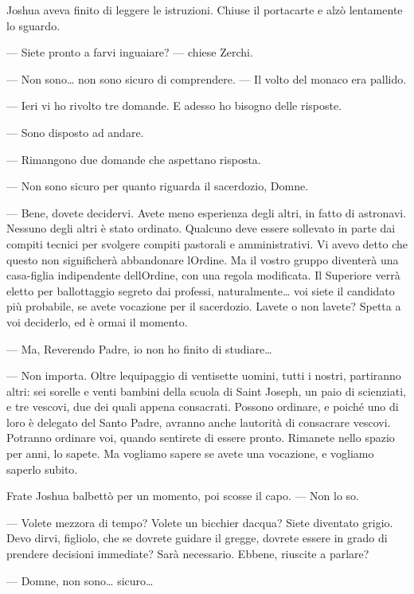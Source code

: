 Joshua aveva finito di leggere le istruzioni. Chiuse il portacarte e
alzò lentamente lo sguardo.

--- Siete pronto a farvi inguaiare? --- chiese Zerchi.

--- Non sono\ldots{} non sono sicuro di comprendere. --- Il volto del
monaco era pallido.

--- Ieri vi ho rivolto tre domande. E adesso ho bisogno delle risposte.

--- Sono disposto ad andare.

--- Rimangono due domande che aspettano risposta.

--- Non sono sicuro per quanto riguarda il sacerdozio, Domne.

--- Bene, dovete decidervi. Avete meno esperienza degli altri, in fatto
di astronavi. Nessuno degli altri è stato ordinato. Qualcuno deve essere
sollevato in parte dai compiti tecnici per svolgere compiti pastorali e
amministrativi. Vi avevo detto che questo non significherà abbandonare
l\textquotesingle Ordine. Ma il vostro gruppo diventerà una casa-figlia
indipendente dell\textquotesingle Ordine, con una regola modificata. Il
Superiore verrà eletto per ballottaggio segreto dai professi,
naturalmente\ldots{} voi siete il candidato più probabile, se avete
vocazione per il sacerdozio. L\textquotesingle avete o non
l\textquotesingle avete? Spetta a voi deciderlo, ed è ormai il momento.

--- Ma, Reverendo Padre, io non ho finito di studiare\ldots{}

--- Non importa. Oltre l\textquotesingle equipaggio di ventisette
uomini, tutti i nostri, partiranno altri: sei sorelle e venti bambini
della scuola di Saint Joseph, un paio di scienziati, e tre vescovi, due
dei quali appena consacrati. Possono ordinare, e poiché uno di loro è
delegato del Santo Padre, avranno anche l\textquotesingle autorità di
consacrare vescovi. Potranno ordinare voi, quando sentirete di essere
pronto. Rimanete nello spazio per anni, lo sapete. Ma vogliamo sapere se
avete una vocazione, e vogliamo saperlo subito.

Frate Joshua balbettò per un momento, poi scosse il capo. --- Non lo so.

--- Volete mezz\textquotesingle ora di tempo? Volete un bicchier
d\textquotesingle acqua? Siete diventato grigio. Devo dirvi, figliolo,
che se dovrete guidare il gregge, dovrete essere in grado di prendere
decisioni immediate? Sarà necessario. Ebbene, riuscite a parlare?

--- Domne, non sono\ldots{} sicuro\ldots{}

